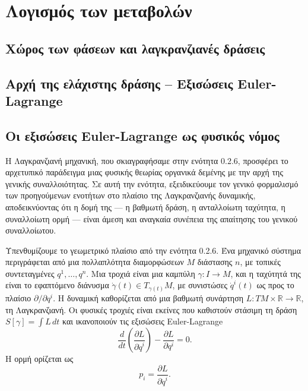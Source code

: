 \documentclass[11pt,a4paper,twoside,openright]{book}
\begin{document}
\chapter{Λογισμός των μεταβολών}
	\label{chapter:calculus-of-variations}

\section{Χώρος των φάσεων και λαγκρανζιανές δράσεις}
\section{Αρχή της ελάχιστης δράσης -- Εξισώσεις Euler-Lagrange}

\section{Οι εξισώσεις Euler-Lagrange ως φυσικός νόμος}

Η Λαγκρανζιανή μηχανική, που σκιαγραφήσαμε στην ενότητα 0.2.6, προσφέρει το αρχετυπικό παράδειγμα μιας φυσικής θεωρίας οργανικά δεμένης με την αρχή της γενικής συναλλοιότητας. Σε αυτή την ενότητα, εξειδικεύουμε τον γενικό φορμαλισμό των προηγούμενων ενοτήτων στο πλαίσιο της Λαγκρανζιανής δυναμικής, αποδεικνύοντας ότι η δομή της — η βαθμωτή δράση, η ανταλλοίωτη ταχύτητα, η συναλλοίωτη ορμή — είναι άμεση και αναγκαία συνέπεια της απαίτησης του γενικού συναλλοίωτου.

Υπενθυμίζουμε το γεωμετρικό πλαίσιο από την ενότητα 0.2.6. Ένα μηχανικό σύστημα περιγράφεται από μια πολλαπλότητα διαμορφώσεων $M$ διάστασης $n$, με τοπικές συντεταγμένες $q^1, \dots, q^n$. Μια τροχιά είναι μια καμπύλη $\gamma: I \to M$, και η ταχύτητά της είναι το εφαπτόμενο διάνυσμα $\dot{\gamma}(t) \in T_{\gamma(t)}M$, με συνιστώσες $\dot{q}^i(t)$ ως προς το πλαίσιο $\partial / \partial q^i$. Η δυναμική καθορίζεται από μια βαθμωτή συνάρτηση $L: TM \times \mathbb{R} \to \mathbb{R}$, τη Λαγκρανζιανή. Οι φυσικές τροχιές είναι εκείνες που καθιστούν στάσιμη τη δράση $S[\gamma] = \int L \, dt$ και ικανοποιούν τις εξισώσεις Euler-Lagrange
\begin{equation}
\frac{d}{dt} \left( \frac{\partial L}{\partial \dot{q}^i} \right) - \frac{\partial L}{\partial q^i} = 0. \tag{0.38}
\end{equation}
Η ορμή ορίζεται ως
\begin{equation}
p_i = \frac{\partial L}{\partial \dot{q}^i}. \tag{0.39}
\end{equation}
\end{document}
